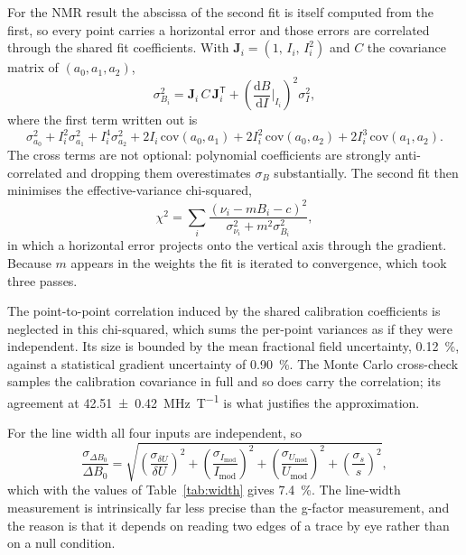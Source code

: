 \documentclass[11pt,a4paper]{article}
\begin{document}
For the NMR result the abscissa of the second fit is itself computed from the first, so every
point carries a horizontal error and those errors are correlated through the shared fit
coefficients. With $\mathbf{J}_i = (1,\,I_i,\,I_i^{2})$ and $C$ the covariance matrix of
$(a_0, a_1, a_2)$,
\begin{equation}
\sigma_{B_i}^{2} = \mathbf{J}_i\,C\,\mathbf{J}_i^{\mathsf{T}}
+ \left(\frac{\mathrm{d}B}{\mathrm{d}I}\bigg|_{I_i}\right)^{2}\sigma_I^{2} ,
\end{equation}
where the first term written out is
\begin{equation}
\sigma_{a_0}^{2} + I_i^{2}\sigma_{a_1}^{2} + I_i^{4}\sigma_{a_2}^{2}
+ 2I_i\,\mathrm{cov}(a_0,a_1) + 2I_i^{2}\,\mathrm{cov}(a_0,a_2) + 2I_i^{3}\,\mathrm{cov}(a_1,a_2) .
\end{equation}
The cross terms are not optional: polynomial coefficients are strongly anti-correlated and
dropping them overestimates $\sigma_B$ substantially. The second fit then minimises the
effective-variance chi-squared,
\begin{equation}
\chi^{2} = \sum_i \frac{\left(\nu_i - m B_i - c\right)^{2}}{\sigma_{\nu_i}^{2} + m^{2}\sigma_{B_i}^{2}} ,
\end{equation}
in which a horizontal error projects onto the vertical axis through the gradient. Because $m$
appears in the weights the fit is iterated to convergence, which took three passes.

The point-to-point correlation induced by the shared calibration coefficients is neglected in
this chi-squared, which sums the per-point variances as if they were independent. Its size is
bounded by the mean fractional field uncertainty, \SI{0.12}{\percent}, against a statistical
gradient uncertainty of \SI{0.90}{\percent}. The Monte Carlo cross-check samples the calibration
covariance in full and so does carry the correlation; its agreement at
\SI{42.51 \pm 0.42}{\mega\hertz\per\tesla} is what justifies the approximation.

For the line width all four inputs are independent, so
\begin{equation}
\frac{\sigma_{\Delta B_0}}{\Delta B_0} = \sqrt{
\left(\frac{\sigma_{\delta U}}{\delta U}\right)^{2}
+ \left(\frac{\sigma_{I_{\mathrm{mod}}}}{I_{\mathrm{mod}}}\right)^{2}
+ \left(\frac{\sigma_{U_{\mathrm{mod}}}}{U_{\mathrm{mod}}}\right)^{2}
+ \left(\frac{\sigma_{s}}{s}\right)^{2}} ,
\end{equation}
which with the values of Table~\ref{tab:width} gives \SI{7.4}{\percent}. The line-width
measurement is intrinsically far less precise than the g-factor measurement, and the reason is
that it depends on reading two edges of a trace by eye rather than on a null condition.
\end{document}
